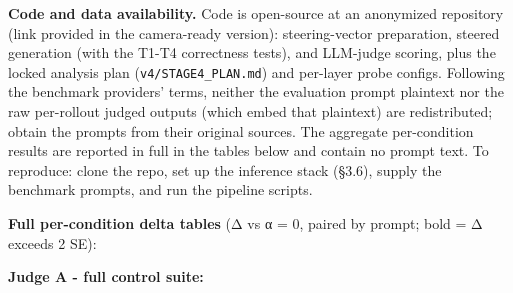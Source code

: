 \documentclass[
]{article}
\begin{document}
\textbf{Code and data availability.} Code is open-source at an
anonymized repository (link provided in the camera-ready version):
steering-vector preparation, steered generation (with the T1-T4
correctness tests), and LLM-judge scoring, plus the locked analysis plan
(\texttt{v4/STAGE4\_PLAN.md}) and per-layer probe configs. Following the
benchmark providers' terms, neither the evaluation prompt plaintext nor
the raw per-rollout judged outputs (which embed that plaintext) are
redistributed; obtain the prompts from their original sources. The
aggregate per-condition results are reported in full in the tables below
and contain no prompt text. To reproduce: clone the repo, set up the
inference stack (§3.6), supply the benchmark prompts, and run the
pipeline scripts.

\textbf{Full per-condition delta tables} (Δ vs α = 0, paired by prompt;
bold = \textbar Δ\textbar{} exceeds 2 SE):

\textbf{Judge A - full control suite:}
\end{document}
